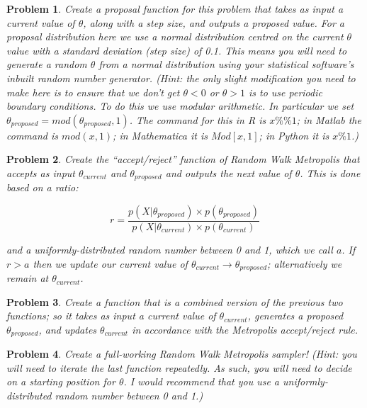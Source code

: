 \documentclass{article}
\newtheorem{problem}{Problem}[section]
\begin{document}
\begin{problem}
Create a proposal function for this problem that takes as input a current value of $\theta$, along with a step size, and outputs a proposed value. For a proposal distribution here we use a normal distribution centred on the current $\theta$ value with a standard deviation (step size) of 0.1. This means you will need to generate a random $\theta$ from a normal distribution using your statistical software's inbuilt random number generator. (Hint: the only slight modification you need to make here is to ensure that we don't get $\theta < 0$ or $\theta > 1$ is to use periodic boundary conditions. To do this we use modular arithmetic. In particular we set $\theta_{proposed} = mod(\theta_{proposed},1)$. The command for this in R is $x \%\% 1$; in Matlab the command is $mod(x,1)$; in Mathematica it is $Mod[x,1]$; in Python it is $x \% 1$.)
\end{problem}

\begin{problem}
Create the ``accept/reject'' function of Random Walk Metropolis that accepts as input $\theta_{current}$ and $\theta_{proposed}$ and outputs the next value of $\theta$. This is done based on a ratio:

\begin{equation}
r = \frac{p(X|\theta_{proposed}) \times p(\theta_{proposed})}{p(X|\theta_{current}) \times p(\theta_{current})}
\end{equation}

and a uniformly-distributed random number between 0 and 1, which we call $a$. If $r > a$ then we update our current value of $\theta_{current} \rightarrow \theta_{proposed}$; alternatively we remain at $\theta_{current}$. 
\end{problem}

\begin{problem}
Create a function that is a combined version of the previous two functions; so it takes as input a current value of $\theta_{current}$, generates a proposed $\theta_{proposed}$, and updates $\theta_{current}$ in accordance with the Metropolis accept/reject rule.
\end{problem}

\begin{problem}
Create a full-working Random Walk Metropolis sampler! (Hint: you will need to iterate the last function repeatedly. As such, you will need to decide on a starting position for $\theta$. I would recommend that you use a uniformly-distributed random number between 0 and 1.)
\end{problem}
\end{document}

